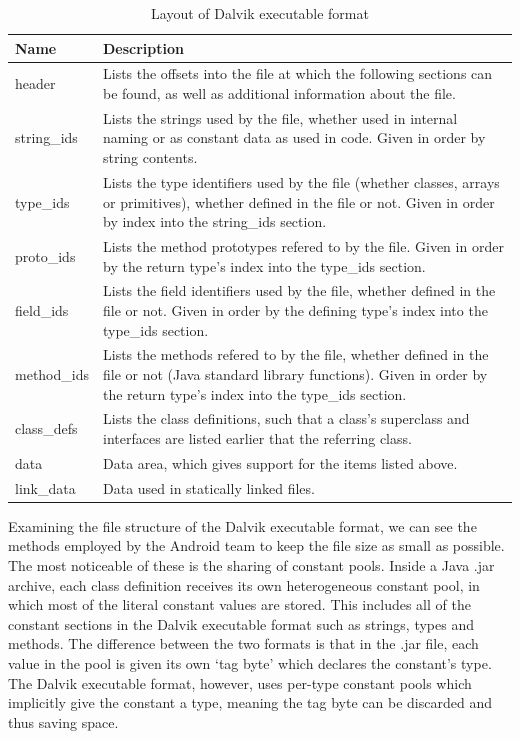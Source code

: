 \begin{center}
\begin{table}[htbp]
    \begin{tabular}{ | l | p{10cm} | } \hline
    Name 		& Description \\ \hline
    header		&	Lists the offsets into the file at which the following sections can be found, as well as additional information about the file. \\ \hline
	string\_ids	&	Lists the strings used by the file, whether used in internal naming or as constant data as used in code. Given in order by string contents. \\ \hline
	type\_ids	&	Lists the type identifiers used by the file (whether classes, arrays or primitives), whether defined in the file or not. Given in order by index into the string\_ids section. \\ \hline
	proto\_ids	&	Lists the method prototypes refered to by the file. Given in order by the return type's index into the type\_ids section. \\ \hline
	field\_ids	&	Lists the field identifiers used by the file, whether defined in the file or not. Given in order by the defining type's index into the type\_ids section. \\ \hline
	method\_ids	&	Lists the methods refered to by the file, whether defined in the file or not (\ie Java standard library functions).
					Given in order by the return type's index into the type\_ids section. \\ \hline
	class\_defs	&	Lists the class definitions, such that a class's superclass and interfaces are listed earlier that the referring class. \\ \hline
	data		&	Data area, which gives support for the items listed above. \\ \hline
	link\_data	&	Data used in statically linked files. \\ \hline
    \end{tabular}
    
    \caption{Layout of Dalvik executable format}
    \label{tab:dalvik_layout}
\end{table}
\end{center}

Examining the file structure of the Dalvik executable format, we can see the methods employed by the Android team to keep the file size as small as possible. The most noticeable of these is the sharing of constant pools. Inside a Java .jar archive, each class definition receives its own heterogeneous constant pool, in which most of the literal constant values are stored. This includes all of the constant sections in the Dalvik executable format such as strings, types and methods. The difference between the two formats is that in the .jar file, each value in the pool is given its own `tag byte' which declares the constant's type. The Dalvik executable format, however, uses per-type constant pools which implicitly give the constant a type, meaning the tag byte can be discarded and thus saving space.

